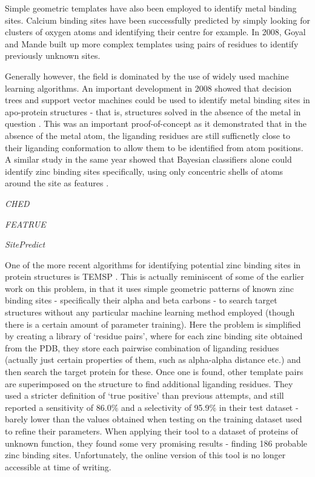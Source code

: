 Simple geometric templates have also been employed to identify metal binding sites. Calcium binding sites have been successfully predicted by simply looking for clusters of oxygen atoms and identifying their centre \cite{deng2006} for example. In 2008, Goyal and Mande built up more complex templates using pairs of residues to identify previously unknown 
sites.

Generally however, the field is dominated by the use of widely used machine learning algorithms. An important development in 2008 showed that decision trees and support vector machines could be used to identify metal binding sites in apo-protein structures - that is, structures solved in the absence of the metal in question \cite{babor2008}. This was an important proof-of-concept as it demonstrated that in the absence of the metal atom, the liganding residues are still sufficnetly close to their liganding conformation to allow them to be identified from atom positions. A similar study in the same year showed that Bayesian classifiers alone could identify zinc binding sites specifically, using only concentric shells of atoms around the site as features \cite{ebert2008}.

\emph{CHED}

\emph{FEATRUE}

\emph{SitePredict}


One of the more recent algorithms for identifying potential zinc binding sites in protein structures is TEMSP \cite{zhao2011structure}. This is actually reminiscent of some of the earlier work on this problem, in that it uses simple geometric patterns of known zinc binding sites - specifically their alpha and beta carbons - to search target structures without any particular machine learning method employed (though there is a certain amount of parameter training). Here the problem is simplified by creating a library of `residue pairs', where for each zinc binding site obtained from the PDB, they store each pairwise combination of liganding residues (actually just certain properties of them, such as alpha-alpha distance etc.) and then search the target protein for these. Once one is found, other template pairs are superimposed on the structure to find additional liganding residues. They used a stricter definition of `true positive' than previous attempts, and still reported a sensitivity of 86.0\% and a selectivity of 95.9\% in their test dataset - barely lower than the values obtained when testing on the training dataset used to refine their parameters. When applying their tool to a dataset of proteins of unknown function, they found some very promising results - finding 186 probable zinc binding sites.  Unfortunately, the online version of this tool is no longer accessible at time of writing.


